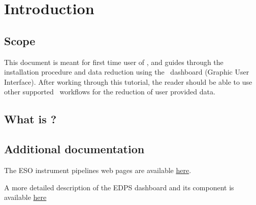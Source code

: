 \section{Introduction}

\subsection{Scope}

This document is meant for first time user of \edps, and guides
through the installation procedure and data reduction using the
\edpsgui\ dashboard (Graphic User Interface). After working through
this tutorial, the reader should be able to use other supported
\edps\ workflows for the reduction of user provided data.

\subsection{What is \edps?}


\subsection{Additional documentation}

The ESO instrument pipelines web pages are available
\href{https://www.eso.org/sci/software/pipe_aem_main.html}{here}.

A more detailed description of the EDPS dashboard and its component is available \href{../}{here} 
